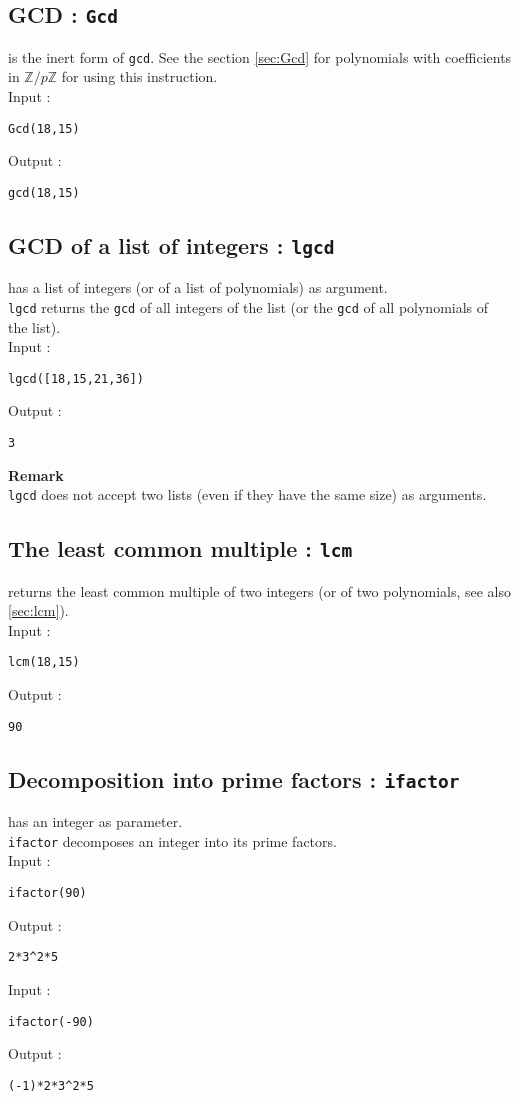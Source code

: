 \documentclass[a4paper,11pt]{book}
\newcommand{\Z}{{\mathbb{Z}}}
\begin{document}
\subsection{GCD : {\tt Gcd}}
 is the inert form of {\tt gcd}. See the section
\ref{sec:Gcd} for polynomials with coefficients in $\Z/p\Z$ 
 for  using this instruction.\\
Input :
\begin{center}{\tt Gcd(18,15)}\end{center}
Output :
\begin{center}{\tt gcd(18,15)}\end{center}


\subsection{GCD of a list of integers : {\tt lgcd}}
 has  a list of integers (or of a list of polynomials)
as argument.\\ 
{\tt lgcd} returns the {\tt gcd} of all integers of the list (or
the {\tt gcd} of all polynomials of the list).\\
Input :
\begin{center}{\tt lgcd([18,15,21,36])}\end{center}
Output :
\begin{center}{\tt 3}\end{center} 
{\bf Remark}\\
{\tt lgcd} does not accept two lists (even if they have the same size)
as arguments.

\subsection{The least common multiple : {\tt lcm}}\label{sec:ilcm}
 returns the least common multiple of two integers (or of
two polynomials, see also \ref{sec:lcm}).\\
Input :
\begin{center}{\tt lcm(18,15) }\end{center}
Output :
\begin{center}{\tt 90}\end{center}

\subsection{Decomposition into prime factors  : {\tt ifactor}}
 has an integer as  parameter.\\
{\tt ifactor} decomposes an integer into its prime factors.\\
Input :
\begin{center}{\tt ifactor(90) }\end{center}
Output :
\begin{center}{\tt 2*3\verb|^|2*5}\end{center}
Input :
\begin{center}{\tt ifactor(-90) }\end{center}
Output :
\begin{center}{\tt (-1)*2*3\verb|^|2*5}\end{center}
\end{document}
